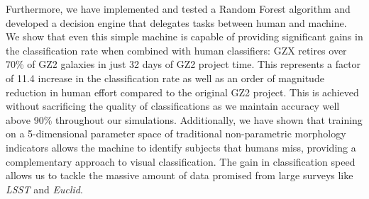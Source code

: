 Furthermore, we have implemented and tested a Random Forest algorithm 
and developed a decision engine that delegates tasks between human and 
machine.  We show that even this simple machine is capable of providing significant 
gains in the classification rate when combined with human classifiers: GZX
 retires over 70\% of GZ2 galaxies in just 32 days of GZ2 project time.  
This represents a factor of 11.4 increase in the classification rate as well as
 an order of magnitude reduction in human effort compared to the original GZ2 project. 
This is achieved without sacrificing the quality of classifications as we maintain 
accuracy well above 90\% throughout our simulations. 
Additionally, we have shown that training on a 5-dimensional parameter space of 
traditional non-parametric morphology indicators allows the machine to identify 
subjects that humans miss, providing  a complementary approach to visual classification. 
The gain in classification speed allows us to tackle the massive amount of data promised
 from large surveys like \textit{LSST} and \textit{Euclid}.
 

